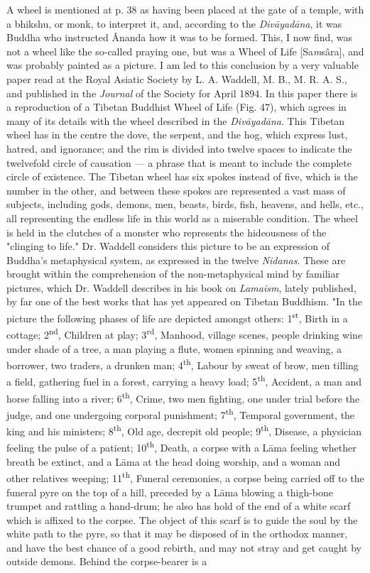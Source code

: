 \documentclass[a4paper, 11pt, oneside, polutonikogreek, english]{article}
\begin{document}
A wheel is mentioned at p. 38 as having been placed at the gate of a temple, with a bhikshu, or monk, to interpret it, and, according to the \emph{Divāyadāna}, it was Buddha who instructed Ânanda how it was to be formed. This, I now find, was not a wheel like the so-called praying one, but was a Wheel of Life [Sa\emph{m}sâra], and was probably painted as a picture. I am led to this conclusion by a very valuable paper read at the Royal Asiatic Society by L. A. Waddell, M. B., M. R. A. S., and published in the \emph{Journal} of the Society for April 1894. In this paper there is a reproduction of a Tibetan Buddhist Wheel of Life (Fig. 47), which agrees in many of its details with the wheel described in the \emph{Divāyadāna}. This Tibetan wheel has in the centre the dove, the serpent, and the hog, which express lust, hatred, and ignorance; and the rim is divided into twelve spaces to indicate the twelvefold circle of causation --- a phrase that is meant to include the complete circle of existence. The Tibetan wheel has six spokes instead of five, which is the number in the other, and between these spokes are represented a vast mass of subjects, including gods, demons, men, beasts, birds, fish, heavens, and hells, etc., all representing the endless life in this world as a miserable condition. The wheel is held in the clutches of a monster who represents the hideousness of the "clinging to life." Dr. Waddell considers this picture to be an expression of Buddha's metaphysical system, as expressed in the twelve \emph{Nidanas}. These are brought within the comprehension of the non-metaphysical mind by familiar pictures, which Dr. Waddell describes in his book on \emph{Lamaism}, lately published, by far one of the best works that has yet appeared on Tibetan Buddhism. "In the picture the following phases of life are depicted amongst others: 1\textsuperscript{st}, Birth in a cottage; 2\textsuperscript{nd}, Children at play; 3\textsuperscript{rd}, Manhood, village scenes, people drinking wine under shade of a tree, a man playing a flute, women spinning and weaving, a borrower, two traders, a drunken man; 4\textsuperscript{th}, Labour by sweat of brow, men tilling a field, gathering fuel in a forest, carrying a heavy load; 5\textsuperscript{th}, Accident, a man and horse falling into a river; 6\textsuperscript{th}, Crime, two men fighting, one under trial before the judge, and one undergoing corporal punishment; 7\textsuperscript{th}, Temporal government, the king and his ministers; 8\textsuperscript{th}, Old age, decrepit old people; 9\textsuperscript{th}, Disease, a physician feeling the pulse of a patient; 10\textsuperscript{th}, Death, a corpse with a Lāma feeling whether breath be extinct, and a Lāma at the head doing worship, and a woman and other relatives weeping; 11\textsuperscript{th}, Funeral ceremonies, a corpse being carried off to the funeral pyre on the top of a hill, preceded by a Lāma blowing a thigh-bone trumpet and rattling a hand-drum; he also has hold of the end of a white scarf which is affixed to the corpse. The object of this scarf is to guide the soul by the white path to the pyre, so that it may be disposed of in the orthodox manner, and have the best chance of a good rebirth, and may not stray and get caught by outside demons. Behind the corpse-bearer is a 
\end{document}
